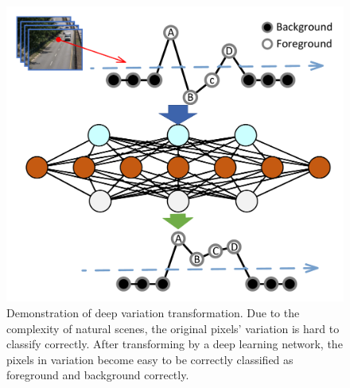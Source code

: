 \documentclass[journal]{IEEEtran}
\begin{document}
\begin{figure}[!t]	%
\centering
    \includegraphics[width=\linewidth]{figure/demo.pdf}
    \caption{Demonstration of deep variation transformation. Due to the complexity of natural scenes, the original pixels' variation is hard to classify correctly. After transforming by a deep learning network, the pixels in variation become easy to be correctly classified as foreground and background correctly.}
    \label{idea}
\end{figure}
\end{document}
